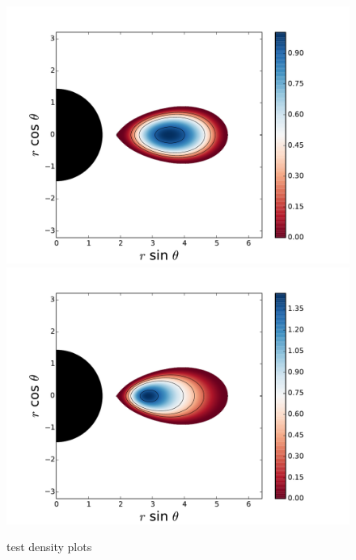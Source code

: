 \documentclass{aa}
\begin{document}
\begin{figure}
\centering
\includegraphics[scale=0.4]{images/1.pdf}
\includegraphics[scale=0.4]{images/2.pdf}
\caption{test density plots}
           \label{FigGam}%
 \end{figure}
\end{document}
